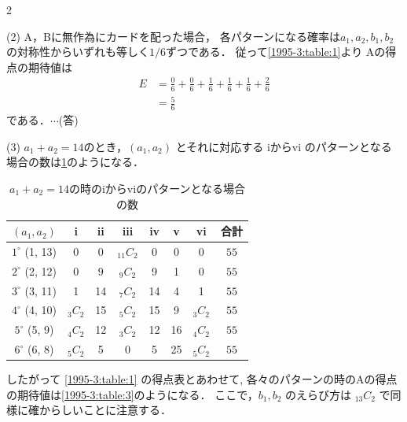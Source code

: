 \documentclass[../../../../main.tex]{subfiles}
\begin{document}
\begin{multicols}{2}
  \vspace{10pt}

  (2)
  A，Bに無作為にカードを配った場合， 各パターンになる確率は$a_1,a_2,b_1,b_2$の対称性からいずれも等しく$1/6$ずつである．
  従って\cref{1995-3:table:1}より
  Aの得点の期待値は
  \begin{align*}
    E
     & = \frac{0}{6} + \frac{0}{6} + \frac{1}{6} + \frac{1}{6} + \frac{1}{6} + \frac{2}{6} \\
     & = \frac{5}{6}
  \end{align*}
  である．$\cdots$(答)

  \vspace{10pt}
  (3)
  $a_1+a_2=14$のとき，$(a_1, a_2)$ とそれに対応する iからvi のパターンとなる場合の数は\cref{1995-3:table:2}のようになる．
  \begin{table}[H]
    \centering
    \caption{$a_1+a_2=14$の時のiからviのパターンとなる場合の数}
    \label{1995-3:table:2}
    \begin{tabular}{|c||c|c|c|c|c|c|c|}
      \hline
      $(a_1, a_2)$      & i         & ii & iii        & iv & v  & vi        & 合計   \\
      \hline
      $1^\circ$ (1, 13) & 0         & 0  & $_{11}C_2$ & 0  & 0  & 0         & $55$ \\
      \hline
      $2^\circ$ (2, 12) & 0         & 9  & $_{9}C_2$  & 9  & 1  & 0         & $55$ \\
      \hline
      $3^\circ$ (3, 11) & 1         & 14 & $_{7}C_2$  & 14 & 4  & 1         & $55$ \\
      \hline
      $4^\circ$ (4, 10) & $_{3}C_2$ & 15 & $_{5}C_2$  & 15 & 9  & $_{3}C_2$ & $55$ \\
      \hline
      $5^\circ$ (5, 9)  & $_{4}C_2$ & 12 & $_{3}C_2$  & 12 & 16 & $_{4}C_2$ & $55$ \\
      \hline
      $6^\circ$ (6, 8)  & $_{5}C_2$ & 5  & 0          & 5  & 25 & $_{5}C_2$ & $55$ \\
      \hline
    \end{tabular}
  \end{table}

  したがって \cref{1995-3:table:1} の得点表とあわせて,
  各々のパターンの時のAの得点の期待値は\cref{1995-3:table:3}のようになる．
  ここで，$b_1, b_2$ のえらび方は $_{13}C_2$ で同様に確からしいことに注意する．


\end{multicols}
\end{document}

